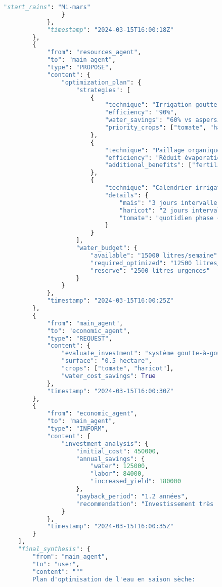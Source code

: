 \begin{figure}[h]
\begin{lstlisting}[language=Python, caption=Exemples de communications inter-agents en action]
                    "start_rains": "Mi-mars"
                }
            },
            "timestamp": "2024-03-15T16:00:18Z"
        },
        {
            "from": "resources_agent",
            "to": "main_agent",
            "type": "PROPOSE",
            "content": {
                "optimization_plan": {
                    "strategies": [
                        {
                            "technique": "Irrigation goutte-à-goutte",
                            "efficiency": "90%",
                            "water_savings": "60% vs aspersion",
                            "priority_crops": ["tomate", "haricot"]
                        },
                        {
                            "technique": "Paillage organique",
                            "efficiency": "Réduit évaporation 70%",
                            "additional_benefits": ["fertilité", "température sol"]
                        },
                        {
                            "technique": "Calendrier irrigation",
                            "details": {
                                "maïs": "3 jours intervalle, matin",
                                "haricot": "2 jours intervalle",
                                "tomate": "quotidien phase critique"
                            }
                        }
                    ],
                    "water_budget": {
                        "available": "15000 litres/semaine",
                        "required_optimized": "12500 litres/semaine",
                        "reserve": "2500 litres urgences"
                    }
                }
            },
            "timestamp": "2024-03-15T16:00:25Z"
        },
        {
            "from": "main_agent",
            "to": "economic_agent",
            "type": "REQUEST",
            "content": {
                "evaluate_investment": "système goutte-à-goutte",
                "surface": "0.5 hectare",
                "crops": ["tomate", "haricot"],
                "water_cost_savings": True
            },
            "timestamp": "2024-03-15T16:00:30Z"
        },
        {
            "from": "economic_agent",
            "to": "main_agent",
            "type": "INFORM",
            "content": {
                "investment_analysis": {
                    "initial_cost": 450000,
                    "annual_savings": {
                        "water": 125000,
                        "labor": 84000,
                        "increased_yield": 180000
                    },
                    "payback_period": "1.2 années",
                    "recommendation": "Investissement très rentable"
                }
            },
            "timestamp": "2024-03-15T16:00:35Z"
        }
    ],
    "final_synthesis": {
        "from": "main_agent",
        "to": "user",
        "content": """
        Plan d'optimisation de l'eau en saison sèche:


\end{lstlisting}
\end{figure}
